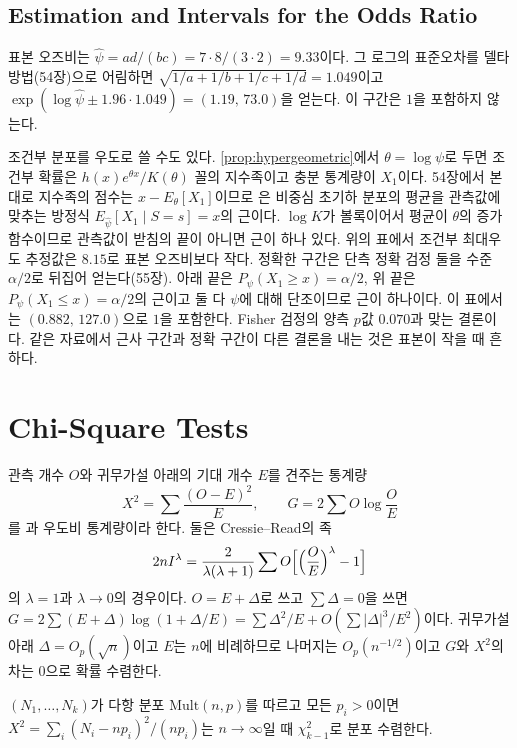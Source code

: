 \subsection{Estimation and Intervals for the Odds Ratio}

표본 오즈비는 $\hat\psi=ad/(bc)=7\cdot8/(3\cdot2)=9.33$이다. 그 로그의 표준오차를 델타 방법(54장)으로 어림하면 $\sqrt{1/a+1/b+1/c+1/d}=1.049$이고  $\exp(\log\hat\psi\pm1.96\cdot1.049)=(1.19,\,73.0)$을 얻는다\cite{woolf1955}. 이 구간은 $1$을 포함하지 않는다.

조건부 분포를 우도로 쓸 수도 있다. \cref{prop:hypergeometric}에서 $\theta=\log\psi$로 두면 조건부 확률은 $h(x)e^{\theta x}/K(\theta)$ 꼴의 지수족이고 충분 통계량이 $X_1$이다. 54장에서 본 대로 지수족의 점수는 $x-E_\theta[X_1]$이므로 은 비중심 초기하 분포의 평균을 관측값에 맞추는 방정식 $E_{\hat\psi}[X_1\mid S=s]=x$의 근이다. $\log K$가 볼록이어서 평균이 $\theta$의 증가 함수이므로 관측값이 받침의 끝이 아니면 근이 하나 있다. 위의 표에서 조건부 최대우도 추정값은 $8.15$로 표본 오즈비보다 작다. 정확한 구간은 단측 정확 검정 둘을 수준 $\alpha/2$로 뒤집어 얻는다(55장). 아래 끝은 $P_\psi(X_1\ge x)=\alpha/2$, 위 끝은 $P_\psi(X_1\le x)=\alpha/2$의 근이고 둘 다 $\psi$에 대해 단조이므로 근이 하나이다. 이 표에서는 $(0.882,\,127.0)$으로 $1$을 포함한다. Fisher 검정의 양측 $p$값 $0.070$과 맞는 결론이다. 같은 자료에서 근사 구간과 정확 구간이 다른 결론을 내는 것은 표본이 작을 때 흔하다.

\section{Chi-Square Tests}
\label{sec:chi-square}

관측 개수 $O$와 귀무가설 아래의 기대 개수 $E$를 견주는 통계량
\[
X^2=\sum\frac{(O-E)^2}E,\qquad G=2\sum O\log\frac OE
\]
를 \cite{pearson1900chi}과 우도비 통계량이라 한다. 둘은 Cressie--Read의  족
\[
2nI^\lambda=\frac2{\lambda(\lambda+1)}\sum O\Bigl[\Bigl(\frac OE\Bigr)^\lambda-1\Bigr]
\]
의 $\lambda=1$과 $\lambda\to0$의 경우이다\cite{cressie1984}. $O=E+\Delta$로 쓰고 $\sum\Delta=0$을 쓰면 $G=2\sum(E+\Delta)\log(1+\Delta/E)=\sum\Delta^2/E+O(\sum|\Delta|^3/E^2)$이다. 귀무가설 아래 $\Delta=O_p(\sqrt n)$이고 $E$는 $n$에 비례하므로 나머지는 $O_p(n^{-1/2})$이고 $G$와 $X^2$의 차는 $0$으로 확률 수렴한다.

\begin{theorem}
\label{thm:pearson-gof}
$(N_1,\dots,N_k)$가 다항 분포 $\mathrm{Mult}(n,p)$를 따르고 모든 $p_i>0$이면 $X^2=\sum_i(N_i-np_i)^2/(np_i)$는 $n\to\infty$일 때 $\chi^2_{k-1}$로 분포 수렴한다.
\end{theorem}

